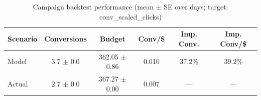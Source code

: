 \begin{table}[htbp]
\centering
\caption{Campaign backtest performance (mean $\pm$ SE over days; target: conv_scaled_clicks)}
\begin{tabular}{lccccc}
\toprule
Scenario & Conversions & Budget & Conv/\$ & Imp. Conv. & Imp. Conv/\$ \\
\midrule
Model & 3.7 $\pm$ 0.0 & 362.05 $\pm$ 0.86 & 0.010 & 37.2\% & 39.2\% \\
Actual & 2.7 $\pm$ 0.0 & 367.27 $\pm$ 0.00 & 0.007 & --- & --- \\
\bottomrule
\end{tabular}

\end{table}
